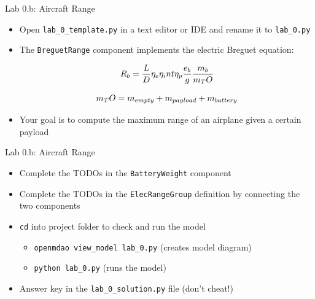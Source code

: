 \documentclass[aspectratio=169, usenames,dvipsnames, 14pt]{beamer}
\begin{document}

\begin{frame}{Lab 0.b: Aircraft Range}
    \begin{itemize}
        \item Open \texttt{lab\_0\_template.py} in a text editor or IDE and rename it to \texttt{lab\_0.py}
        
        \item The \texttt{BreguetRange} component implements the electric Breguet equation: 
        
        \begin{equation}
          \small R_b= \frac{L}{D}\eta_e \eta_int \eta_p \frac{e_b}{g} \frac{m_b}{m_TO} 
        \end{equation}
        
        \begin{equation}
          \small m_TO = m_{empty} + m_{payload} + m_{battery}
        \end{equation}
        
        \item Your goal is to compute the maximum range of an airplane given a certain payload
    \end{itemize}
\end{frame}


\begin{frame}{Lab 0.b: Aircraft Range}
    \begin{itemize}
        \item Complete the TODOs in the \texttt{BatteryWeight} component
        \vspace{0.3cm}
        \item Complete the TODOs in the \texttt{ElecRangeGroup} definition by connecting the two components
        \vspace{0.3cm}
        \item \texttt{cd} into project folder to check and run the model
            \begin{itemize}
                \item \texttt{openmdao view\_model lab\_0.py}  (creates model diagram)
                \item \texttt{python lab\_0.py}               (runs the model)
            \end{itemize}
            \vspace{0.3cm}
        \item Answer key in the \texttt{lab\_0\_solution.py} file (don’t cheat!)
    \end{itemize}
\end{frame}
\end{document}

